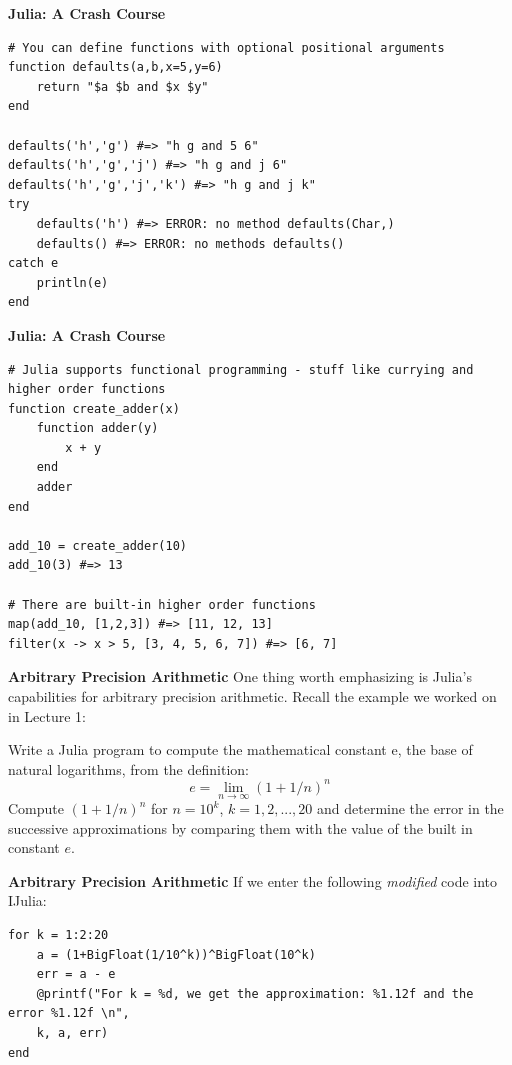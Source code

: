 \documentclass[xcolor=dvipsnames]{beamer}
\begin{document}
\begin{frame}[fragile]
{\bf Julia: A Crash Course}
\begin{lstlisting}
# You can define functions with optional positional arguments
function defaults(a,b,x=5,y=6)
    return "$a $b and $x $y"
end

defaults('h','g') #=> "h g and 5 6"
defaults('h','g','j') #=> "h g and j 6"
defaults('h','g','j','k') #=> "h g and j k"
try
    defaults('h') #=> ERROR: no method defaults(Char,)
    defaults() #=> ERROR: no methods defaults()
catch e
    println(e)
end
\end{lstlisting}
\end{frame}

\begin{frame}[fragile]
{\bf Julia: A Crash Course}
\begin{lstlisting}
# Julia supports functional programming - stuff like currying and higher order functions
function create_adder(x)
    function adder(y)
        x + y
    end
    adder
end

add_10 = create_adder(10)
add_10(3) #=> 13

# There are built-in higher order functions
map(add_10, [1,2,3]) #=> [11, 12, 13]
filter(x -> x > 5, [3, 4, 5, 6, 7]) #=> [6, 7]
\end{lstlisting}
\end{frame}

\begin{frame}[fragile]
{\bf Arbitrary Precision Arithmetic}
One thing worth emphasizing is Julia's capabilities for arbitrary precision arithmetic. Recall the example we worked on in Lecture 1: 
\vfill
\pause

Write a Julia program to compute the mathematical constant e, the base of natural logarithms, from the definition:
\[ e = \lim\limits_{n \rightarrow \infty} (1+1/n)^n \]
Compute $(1 + 1/n)^n$ for $n = 10^k$, $k = 1, 2, ..., 20$ and determine the error in the successive approximations by comparing them with the value of the built in constant $e$.  \\
\end{frame}

\begin{frame}[fragile]
{\bf Arbitrary Precision Arithmetic}
If we enter the following \emph{modified} code into IJulia:
\begin{lstlisting}
for k = 1:2:20
    a = (1+BigFloat(1/10^k))^BigFloat(10^k)
    err = a - e
    @printf("For k = %d, we get the approximation: %1.12f and the error %1.12f \n", 
    k, a, err)
end
\end{lstlisting}
\end{frame}
\end{document}
